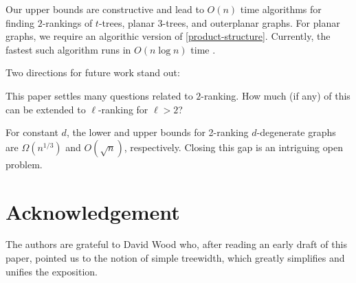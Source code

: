 \documentclass[kpfonts]{patmorin}
\theoremstyle{named}
\begin{document}
Our upper bounds are constructive and lead to $O(n)$ time algorithms for finding $2$-rankings of $t$-trees, planar 3-trees, and outerplanar graphs.  For planar graphs, we require an algorithic version of \cref{product-structure}. Currently, the fastest such algorithm runs in $O(n\log n)$ time \cite{morin:fast}.

Two directions for future work stand out:
\begin{inparaenum}[(i)]
    \item This paper settles many questions related to $2$-ranking.  How much (if any) of this can be extended to $\ell$-ranking for $\ell>2$?
    \item For constant $d$, the lower and upper bounds for 2-ranking $d$-degenerate graphs are $\Omega(n^{1/3})$ and $O(\sqrt{n})$, respectively.  Closing this gap is an intriguing open problem.
\end{inparaenum}

\section*{Acknowledgement}

The authors are grateful to David Wood who, after reading an early draft of this paper, pointed us to the notion of simple treewidth, which greatly simplifies and unifies the exposition.




\end{document}

